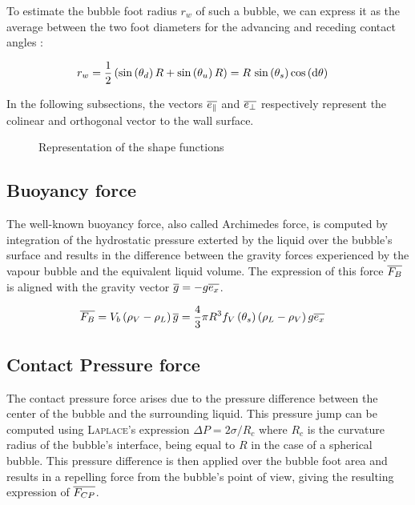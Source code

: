 \npar

To estimate the bubble foot radius $r_{w}$ of such a bubble, we can express it as the average between the two foot diameters for the advancing and receding contact angles :

\begin{align}
r_{w} &= \frac{1}{2}\left( \mathrm{sin}\left( \theta_{d} \right)R + \mathrm{sin}\left( \theta_{u} \right)R \right) = R~\mathrm{sin}\left( \theta_{s} \right)\mathrm{cos}\left( \mathrm{d}\theta \right)
\end{align}

\npar

In the following subsections, the vectors $\overline{e_{\|}}$ and $\overline{e_{\bot}}$ respectively represent the colinear and orthogonal vector to the wall surface.


\begin{figure}[h!]


\caption{Representation of the shape functions}
\end{figure}


\subsection{Buoyancy force}

The well-known buoyancy force, also called Archimedes force, is computed by integration of the hydrostatic pressure exterted by the liquid over the bubble's surface and results in the difference between the gravity forces experienced by the vapour bubble and the equivalent liquid volume. The expression of this force $\overline{F_{B}}$ is aligned with the gravity vector $\overline{g}=-g\overline{e_{x}}$.

\begin{align}
\overline{F_{B}}&=V_{b}\left( \rho_{V}-\rho_{L} \right)\overline{g}=\frac{4}{3}\pi R^{3}f_{V}\left( \theta_{s} \right)\left( \rho_{L}-\rho_{V} \right)g\overline{e_{x}}
\end{align}

\subsection{Contact Pressure force}

The contact pressure force arises due to the pressure difference between the center of the bubble and the surrounding liquid. This pressure jump can be computed using \textsc{Laplace}'s expression $\Delta P = 2\sigma / R_{c}$ where $R_{c}$ is the curvature radius of the bubble's interface, being equal to $R$ in the case of a spherical bubble. This pressure difference is then applied over the bubble foot area and results in a repelling force from the bubble's point of view, giving the resulting expression of $\overline{F_{CP}}$.

